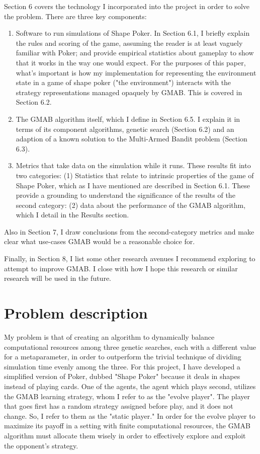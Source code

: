 \documentclass[11pt]{article}
\begin{document}
Section 6 covers the technology I incorporated into the project in order to solve the problem. There are three key components:
\begin{enumerate}
    \item Software to run simulations of Shape Poker. In Section 6.1, I briefly explain the rules and scoring of the game, assuming the reader is at least vaguely familiar with Poker; and provide empirical statistics about gameplay to show that it works in the way one would expect. For the purposes of this paper, what's important is how my implementation for representing the environment state in a game of shape poker ("the environment") interacts with the strategy representations managed opaquely by GMAB. This is covered in Section 6.2.
    \item The GMAB algorithm itself, which I define in Section 6.5. I explain it in terms of its component algorithms, genetic search (Section 6.2) and an adaption of a known solution to the Multi-Armed Bandit problem (Section 6.3). 
    \item Metrics that take data on the simulation while it runs. These results fit into two categories: (1) Statistics that relate to intrinsic properties of the game of Shape Poker, which as I have mentioned are described in Section 6.1. These provide a grounding to understand the significance of the results of the second category: (2) data about the performance of the GMAB algorithm, which I detail in the Results section.
\end{enumerate} 

Also in Section 7, I draw conclusions from the second-category metrics and make clear what use-cases GMAB would be a reasonable choice for.

Finally, in Section 8, I list some other research avenues I recommend exploring to attempt to improve GMAB. I close with how I hope this research or similar research will be used in the future.

\section{Problem description}
My problem is that of creating an algorithm to dynamically balance computational resources among three genetic searches, each with a different value for a metaparameter, in order to outperform the trivial technique of dividing simulation time evenly among the three. For this project, I have developed a simplified version of Poker, dubbed "Shape Poker" because it deals in shapes instead of playing cards. One of the agents, the agent which plays second, utilizes the GMAB learning strategy, whom I refer to as the "evolve player". The player that goes first has a random strategy assigned before play, and it does not change. So, I refer to them as the "static player." In order for the evolve player to maximize its payoff in a setting with finite computational resources, the GMAB algorithm must allocate them wisely in order to effectively explore and exploit the opponent's strategy. 
\end{document}
